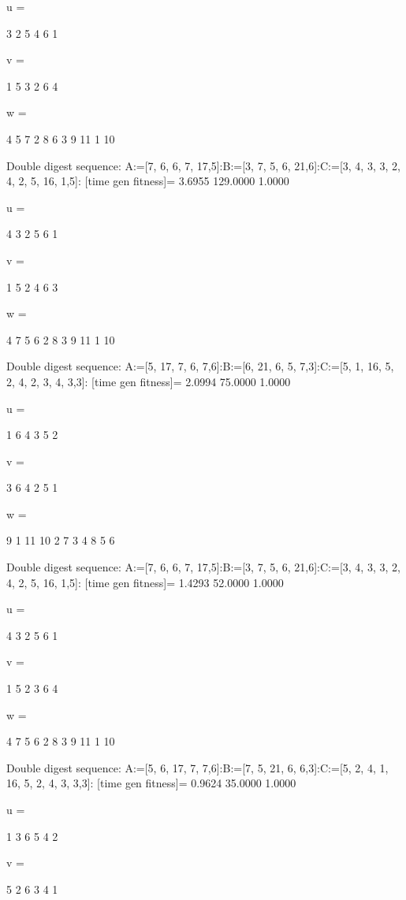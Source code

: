 u =

     3     2     5     4     6     1


v =

     1     5     3     2     6     4


w =

     4     5     7     2     8     6     3     9    11     1    10

Double digest sequence:
A:=[7, 6, 6, 7, 17,5]:B:=[3, 7, 5, 6, 21,6]:C:=[3, 4, 3, 3, 2, 4, 2, 5, 16, 1,5]:
[time gen fitness]=
    3.6955  129.0000    1.0000


u =

     4     3     2     5     6     1


v =

     1     5     2     4     6     3


w =

     4     7     5     6     2     8     3     9    11     1    10

Double digest sequence:
A:=[5, 17, 7, 6, 7,6]:B:=[6, 21, 6, 5, 7,3]:C:=[5, 1, 16, 5, 2, 4, 2, 3, 4, 3,3]:
[time gen fitness]=
    2.0994   75.0000    1.0000


u =

     1     6     4     3     5     2


v =

     3     6     4     2     5     1


w =

     9     1    11    10     2     7     3     4     8     5     6

Double digest sequence:
A:=[7, 6, 6, 7, 17,5]:B:=[3, 7, 5, 6, 21,6]:C:=[3, 4, 3, 3, 2, 4, 2, 5, 16, 1,5]:
[time gen fitness]=
    1.4293   52.0000    1.0000


u =

     4     3     2     5     6     1


v =

     1     5     2     3     6     4


w =

     4     7     5     6     2     8     3     9    11     1    10

Double digest sequence:
A:=[5, 6, 17, 7, 7,6]:B:=[7, 5, 21, 6, 6,3]:C:=[5, 2, 4, 1, 16, 5, 2, 4, 3, 3,3]:
[time gen fitness]=
    0.9624   35.0000    1.0000


u =

     1     3     6     5     4     2


v =

     5     2     6     3     4     1


